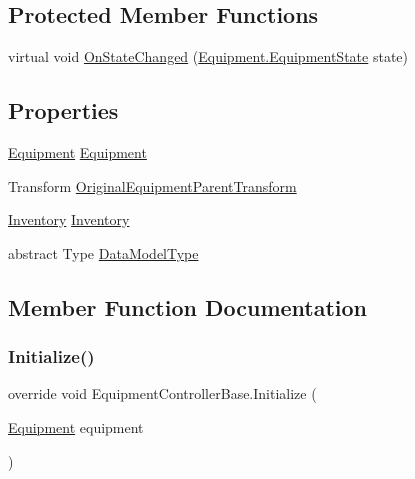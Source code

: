 \subsection*{Protected Member Functions}
\begin{DoxyCompactItemize}
\item 
virtual void \mbox{\hyperlink{class_equipment_controller_base_a324ae128d6b938e23a6d1c4a33c370c4}{On\+State\+Changed}} (\mbox{\hyperlink{class_equipment_a8b3877398e5be5b420818b99ad7f0bca}{Equipment.\+Equipment\+State}} state)
\end{DoxyCompactItemize}
\subsection*{Properties}
\begin{DoxyCompactItemize}
\item 
\mbox{\hyperlink{class_equipment}{Equipment}} \mbox{\hyperlink{class_equipment_controller_base_a0e82e00ee75a3fcdbaa60e624d4d2032}{Equipment}}
\item 
Transform \mbox{\hyperlink{class_equipment_controller_base_a15d98115cdcca7c633694d14a22248f3}{Original\+Equipment\+Parent\+Transform}}
\item 
\mbox{\hyperlink{class_inventory}{Inventory}} \mbox{\hyperlink{class_equipment_controller_base_a170ba5776e92e8968f26805a9c3c3eb2}{Inventory}}
\item 
abstract Type \mbox{\hyperlink{class_equipment_controller_base_ae45c22292ae69bb37f6b2bb1fbbb219a}{Data\+Model\+Type}}
\end{DoxyCompactItemize}


\subsection{Member Function Documentation}
\mbox{\label{class_equipment_controller_base_a2bd9dfc6d920c98460436504145ebe6f}} 
\subsubsection{\texorpdfstring{Initialize()}{Initialize()}}
{\footnotesize\ttfamily override void Equipment\+Controller\+Base.\+Initialize (\begin{DoxyParamCaption}\item[{\mbox{\hyperlink{class_equipment}{Equipment}}}]{equipment }\end{DoxyParamCaption})\hspace{0.3cm}{\ttfamily [virtual]}}



